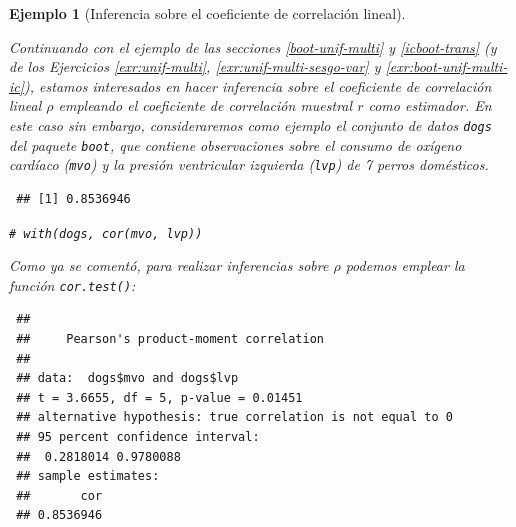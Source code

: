\documentclass[
]{book}
\newenvironment{Shaded}{\begin{snugshade}}{\end{snugshade}}
\newcommand{\AttributeTok}[1]{\textcolor[rgb]{0.77,0.63,0.00}{#1}}
\newcommand{\CommentTok}[1]{\textcolor[rgb]{0.56,0.35,0.01}{\textit{#1}}}
\newcommand{\FunctionTok}[1]{\textcolor[rgb]{0.00,0.00,0.00}{#1}}
\newcommand{\NormalTok}[1]{#1}
\newcommand{\SpecialCharTok}[1]{\textcolor[rgb]{0.00,0.00,0.00}{#1}}
\newcommand{\StringTok}[1]{\textcolor[rgb]{0.31,0.60,0.02}{#1}}
\theoremstyle{break}
\newtheorem{example}{Ejemplo}[chapter]
\theoremstyle{nonumberplain}
\renewcommand{\CommentTok}[1]{\textcolor[rgb]{0.41,0.41,0.41}{\texttt{#1}}}
\begin{document}
\begin{example}[Inferencia sobre el coeficiente de correlación lineal]
\protect\hypertarget{exm:perm-test-cor}{}\label{exm:perm-test-cor}

Continuando con el ejemplo de las secciones \ref{boot-unif-multi} y \ref{icboot-trans} (y de los Ejercicios \ref{exr:unif-multi}, \ref{exr:unif-multi-sesgo-var} y \ref{exr:boot-unif-multi-ic}), estamos interesados en hacer inferencia sobre el coeficiente de correlación lineal \(\rho\) empleando el coeficiente de correlación muestral \(r\) como estimador.
En este caso sin embargo, consideraremos como ejemplo el conjunto de datos \texttt{dogs}
del paquete \texttt{boot}, que contiene observaciones sobre el consumo de
oxígeno cardíaco (\texttt{mvo}) y la presión ventricular izquierda (\texttt{lvp})
de 7 perros domésticos.

\begin{Shaded}
\end{Shaded}

\begin{verbatim}
 ## [1] 0.8536946
\end{verbatim}

\begin{Shaded}
\begin{Highlighting}[]
\CommentTok{\# with(dogs, cor(mvo, lvp))}
\end{Highlighting}
\end{Shaded}

Como ya se comentó, para realizar inferencias sobre \(\rho\) podemos emplear la función \texttt{cor.test()}:

\begin{Shaded}
\end{Shaded}

\begin{verbatim}
 ## 
 ##     Pearson's product-moment correlation
 ## 
 ## data:  dogs$mvo and dogs$lvp
 ## t = 3.6655, df = 5, p-value = 0.01451
 ## alternative hypothesis: true correlation is not equal to 0
 ## 95 percent confidence interval:
 ##  0.2818014 0.9780088
 ## sample estimates:
 ##       cor 
 ## 0.8536946
\end{verbatim}


\end{example}
\end{document}
